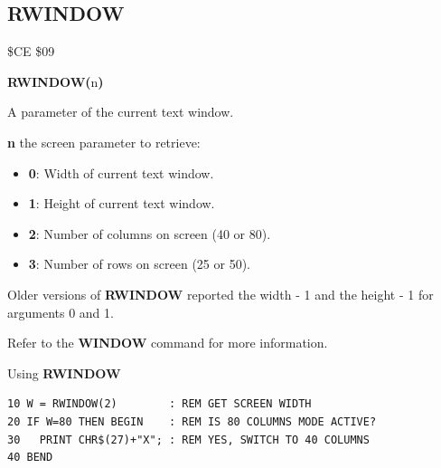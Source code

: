
\newpage
\subsection{RWINDOW}
\begin{description}[leftmargin=2cm,style=nextline]
\item [Token:]    \$CE \$09

\item [Format:]   {\bf RWINDOW(}n{\bf)}

\item [Returns:]  A parameter of the current text window.

                  {\bf n} the screen parameter to retrieve:

                  \begin{itemize}
                     \item {\bf 0}: Width of current text window.
                     \item {\bf 1}: Height of current text window.
                     \item {\bf 2}: Number of columns on screen (40 or 80).
                     \item {\bf 3}: Number of rows on screen (25 or 50).
                  \end{itemize}

\item [Remarks:]  Older versions of {\bf RWINDOW} reported the width - 1 and the height - 1 for arguments 0 and 1.

                  Refer to the {\bf WINDOW} command for more information.

\item [Example:]  Using {\bf RWINDOW}

\begin{tcolorbox}[colback=black,coltext=white]
\verbatimfont{\codefont}
\begin{verbatim}
10 W = RWINDOW(2)        : REM GET SCREEN WIDTH
20 IF W=80 THEN BEGIN    : REM IS 80 COLUMNS MODE ACTIVE?
30   PRINT CHR$(27)+"X"; : REM YES, SWITCH TO 40 COLUMNS
40 BEND
\end{verbatim}
\end{tcolorbox}
\end{description}


\newpage
